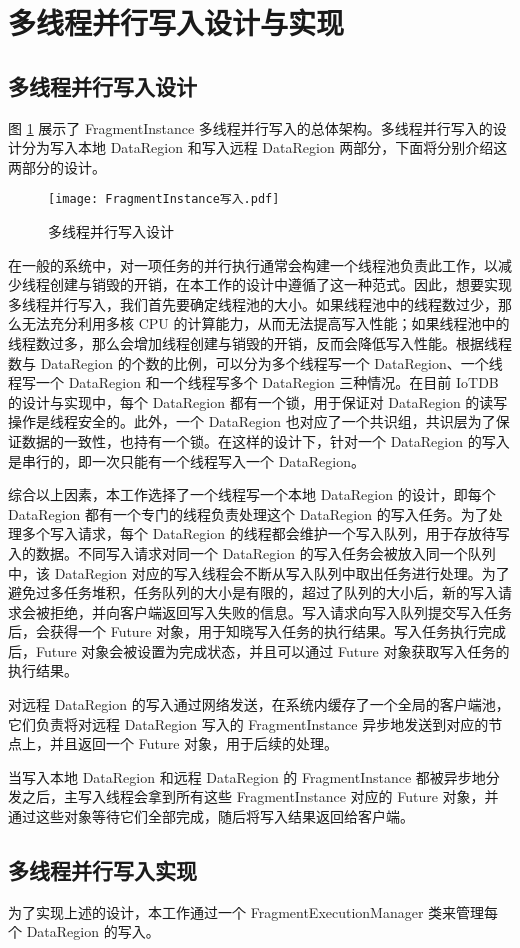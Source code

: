 \section{多线程并行写入设计与实现}
\subsection{多线程并行写入设计}
图 \ref{fig:fi-parallel-write} 展示了 FragmentInstance 多线程并行写入的总体架构。多线程并行写入的设计分为写入本地 DataRegion 和写入远程 DataRegion 两部分，下面将分别介绍这两部分的设计。

\begin{figure}
  \centering
  \texttt{[image: FragmentInstance写入.pdf]}
  \caption{多线程并行写入设计}
  \label{fig:fi-parallel-write}
\end{figure}

在一般的系统中，对一项任务的并行执行通常会构建一个线程池负责此工作，以减少线程创建与销毁的开销，在本工作的设计中遵循了这一种范式。因此，想要实现多线程并行写入，我们首先要确定线程池的大小。如果线程池中的线程数过少，那么无法充分利用多核 CPU 的计算能力，从而无法提高写入性能；如果线程池中的线程数过多，那么会增加线程创建与销毁的开销，反而会降低写入性能。根据线程数与 DataRegion 的个数的比例，可以分为多个线程写一个 DataRegion、一个线程写一个 DataRegion 和一个线程写多个 DataRegion 三种情况。在目前 IoTDB 的设计与实现中，每个 DataRegion 都有一个锁，用于保证对 DataRegion 的读写操作是线程安全的。此外，一个 DataRegion 也对应了一个共识组，共识层为了保证数据的一致性，也持有一个锁。在这样的设计下，针对一个 DataRegion 的写入是串行的，即一次只能有一个线程写入一个 DataRegion。

综合以上因素，本工作选择了一个线程写一个本地 DataRegion 的设计，即每个 DataRegion 都有一个专门的线程负责处理这个 DataRegion 的写入任务。为了处理多个写入请求，每个 DataRegion 的线程都会维护一个写入队列，用于存放待写入的数据。不同写入请求对同一个 DataRegion 的写入任务会被放入同一个队列中，该 DataRegion 对应的写入线程会不断从写入队列中取出任务进行处理。为了避免过多任务堆积，任务队列的大小是有限的，超过了队列的大小后，新的写入请求会被拒绝，并向客户端返回写入失败的信息。写入请求向写入队列提交写入任务后，会获得一个 Future 对象，用于知晓写入任务的执行结果。写入任务执行完成后，Future 对象会被设置为完成状态，并且可以通过 Future 对象获取写入任务的执行结果。

对远程 DataRegion 的写入通过网络发送，在系统内缓存了一个全局的客户端池，它们负责将对远程 DataRegion 写入的 FragmentInstance 异步地发送到对应的节点上，并且返回一个 Future 对象，用于后续的处理。

当写入本地 DataRegion 和远程 DataRegion 的 FragmentInstance 都被异步地分发之后，主写入线程会拿到所有这些 FragmentInstance 对应的 Future 对象，并通过这些对象等待它们全部完成，随后将写入结果返回给客户端。

\subsection{多线程并行写入实现}
为了实现上述的设计，本工作通过一个 FragmentExecutionManager 类来管理每个 DataRegion 的写入。